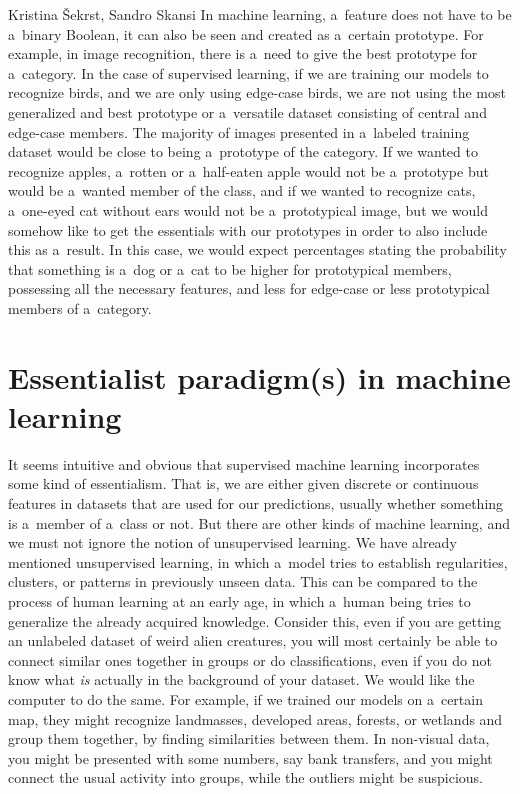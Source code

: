 \begin{artengenv2auth}{Kristina Šekrst, Sandro Skansi}
In machine learning, a~feature does not have to be a~binary Boolean, it can also be seen and created as a~certain prototype. For example, in image recognition, there is a~need to give the best prototype for a~category. In the case of supervised learning, if we are training our models to recognize birds, and we are only using edge-case birds, we are not using the most generalized and best prototype or a~versatile dataset consisting of central and edge-case members. The majority of images presented in a~labeled training dataset would be close to being a~prototype of the category. If we wanted to recognize apples, a~rotten or a~half-eaten apple would not be a~prototype but would be a~wanted member of the class, and if we wanted to recognize cats, a~one-eyed cat without ears would not be a~prototypical image, but we would somehow like to get the essentials with our prototypes in order to also include this as a~result. In this case, we would expect percentages stating the probability that something is a~dog or a~cat to be higher for prototypical members, possessing all the necessary features, and less for edge-case or less prototypical members of a~category.

\section*{Essentialist paradigm(s) in machine learning}
It seems intuitive and obvious that supervised machine learning incorporates some kind of essentialism. That is, we are either given discrete or continuous features in datasets that are used for our predictions, usually whether something is a~member of a~class or not. But there are other kinds of machine learning, and we must not ignore the notion of unsupervised learning. We have already mentioned unsupervised learning, in which a~model tries to establish regularities, clusters, or patterns in previously unseen data. This can be compared to the process of human learning at an early age, in which a~human being tries to generalize the already acquired knowledge. Consider this, even if you are getting an unlabeled dataset of weird alien creatures, you will most certainly be able to connect similar ones together in groups or do classifications, even if you do not know what \textit{is} actually in the background of your dataset. We would like the computer to do the same. For example, if we trained our models on a~certain map, they might recognize landmasses, developed areas, forests, or wetlands and group them together, by finding similarities between them. In non-visual data, you might be presented with some numbers, say bank transfers, and you might connect the usual activity into groups, while the outliers might be suspicious.


\end{artengenv2auth}
